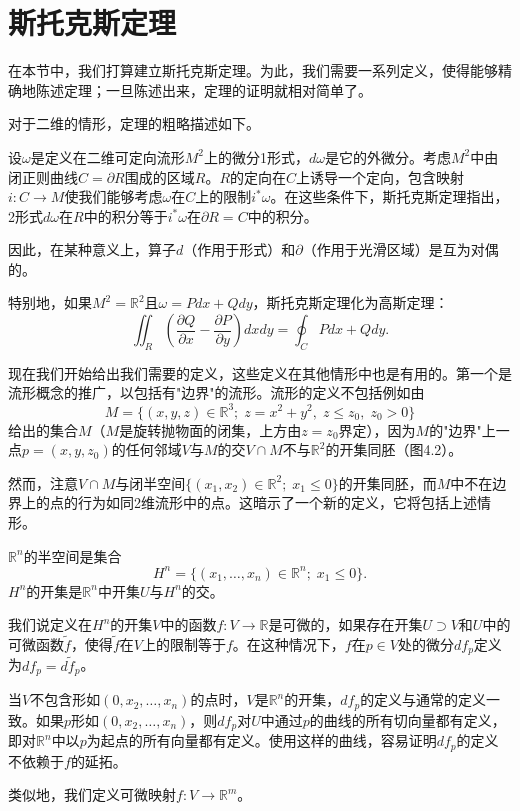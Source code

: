 \documentclass[12pt,a4paper]{ctexbook}
\begin{document}
\section{斯托克斯定理}

在本节中，我们打算建立斯托克斯定理。为此，我们需要一系列定义，使得能够精确地陈述定理；一旦陈述出来，定理的证明就相对简单了。

对于二维的情形，定理的粗略描述如下。

设$\omega$是定义在二维可定向流形$M^2$上的微分1形式，$d\omega$是它的外微分。考虑$M^2$中由闭正则曲线$C=\partial R$围成的区域$R$。$R$的定向在$C$上诱导一个定向，包含映射$i:C\to M$使我们能够考虑$\omega$在$C$上的限制$i^*\omega$。在这些条件下，斯托克斯定理指出，2形式$d\omega$在$R$中的积分等于$i^*\omega$在$\partial R=C$中的积分。

因此，在某种意义上，算子$d$（作用于形式）和$\partial$（作用于光滑区域）是互为对偶的。

特别地，如果$M^2=\mathbb{R}^2$且$\omega = Pdx + Qdy$，斯托克斯定理化为高斯定理：
$$\iint_R \left(\frac{\partial Q}{\partial x} - \frac{\partial P}{\partial y}\right)dxdy = \oint_C Pdx + Qdy.$$

现在我们开始给出我们需要的定义，这些定义在其他情形中也是有用的。第一个是流形概念的推广，以包括有"边界"的流形。流形的定义不包括例如由
$$M = \{(x,y,z)\in\mathbb{R}^3;\; z = x^2+y^2,\; z\leq z_0,\; z_0>0\}$$
给出的集合$M$（$M$是旋转抛物面的闭集，上方由$z=z_0$界定），因为$M$的"边界"上一点$p=(x,y,z_0)$的任何邻域$V$与$M$的交$V\cap M$不与$\mathbb{R}^2$的开集同胚（图4.2）。

然而，注意$V\cap M$与闭半空间$\{(x_1,x_2)\in\mathbb{R}^2;\; x_1\leq 0\}$的开集同胚，而$M$中不在边界上的点的行为如同2维流形中的点。这暗示了一个新的定义，它将包括上述情形。

$\mathbb{R}^n$的半空间是集合
$$H^n = \{(x_1,\ldots,x_n)\in\mathbb{R}^n;\; x_1\leq 0\}.$$
$H^n$的开集是$\mathbb{R}^n$中开集$U$与$H^n$的交。

我们说定义在$H^n$的开集$V$中的函数$f:V\to\mathbb{R}$是可微的，如果存在开集$U\supset V$和$U$中的可微函数$\tilde{f}$，使得$\tilde{f}$在$V$上的限制等于$f$。在这种情况下，$f$在$p\in V$处的微分$df_p$定义为$df_p = d\tilde{f}_p$。

当$V$不包含形如$(0,x_2,\ldots,x_n)$的点时，$V$是$\mathbb{R}^n$的开集，$df_p$的定义与通常的定义一致。如果$p$形如$(0,x_2,\ldots,x_n)$，则$df_p$对$U$中通过$p$的曲线的所有切向量都有定义，即对$\mathbb{R}^n$中以$p$为起点的所有向量都有定义。使用这样的曲线，容易证明$df_p$的定义不依赖于$f$的延拓。

类似地，我们定义可微映射$f:V\to\mathbb{R}^m$。
\end{document}
